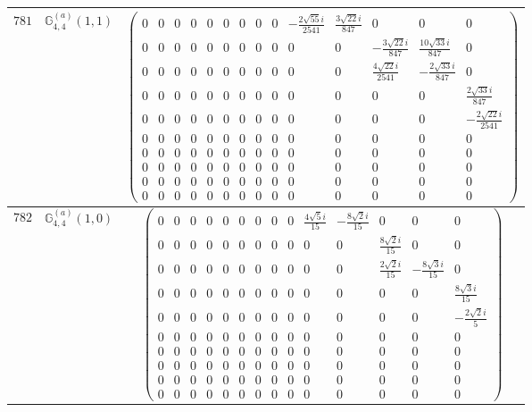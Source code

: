 \documentclass[fleqn,8pt,landscape]{jsarticle}
\begin{document}
\begin{center}
\begin{longtable}{ccc}
$ 781 $ & $ \mathbb{G}_{4,4}^{(a)}(1,1) $ & $ \begin{pmatrix} 0 & 0 & 0 & 0 & 0 & 0 & 0 & 0 & 0 & - \frac{2 \sqrt{55} i}{2541} & \frac{3 \sqrt{22} i}{847} & 0 & 0 & 0 \\ 0 & 0 & 0 & 0 & 0 & 0 & 0 & 0 & 0 & 0 & 0 & - \frac{3 \sqrt{22} i}{847} & \frac{10 \sqrt{33} i}{847} & 0 \\ 0 & 0 & 0 & 0 & 0 & 0 & 0 & 0 & 0 & 0 & 0 & \frac{4 \sqrt{22} i}{2541} & - \frac{2 \sqrt{33} i}{847} & 0 \\ 0 & 0 & 0 & 0 & 0 & 0 & 0 & 0 & 0 & 0 & 0 & 0 & 0 & \frac{2 \sqrt{33} i}{847} \\ 0 & 0 & 0 & 0 & 0 & 0 & 0 & 0 & 0 & 0 & 0 & 0 & 0 & - \frac{2 \sqrt{22} i}{2541} \\ 0 & 0 & 0 & 0 & 0 & 0 & 0 & 0 & 0 & 0 & 0 & 0 & 0 & 0 \\ 0 & 0 & 0 & 0 & 0 & 0 & 0 & 0 & 0 & 0 & 0 & 0 & 0 & 0 \\ 0 & 0 & 0 & 0 & 0 & 0 & 0 & 0 & 0 & 0 & 0 & 0 & 0 & 0 \\ 0 & 0 & 0 & 0 & 0 & 0 & 0 & 0 & 0 & 0 & 0 & 0 & 0 & 0 \\ 0 & 0 & 0 & 0 & 0 & 0 & 0 & 0 & 0 & 0 & 0 & 0 & 0 & 0 \end{pmatrix} $ \\ \hline
$ 782 $ & $ \mathbb{G}_{4,4}^{(a)}(1,0) $ & $ \begin{pmatrix} 0 & 0 & 0 & 0 & 0 & 0 & 0 & 0 & 0 & \frac{4 \sqrt{5} i}{15} & - \frac{8 \sqrt{2} i}{15} & 0 & 0 & 0 \\ 0 & 0 & 0 & 0 & 0 & 0 & 0 & 0 & 0 & 0 & 0 & \frac{8 \sqrt{2} i}{15} & 0 & 0 \\ 0 & 0 & 0 & 0 & 0 & 0 & 0 & 0 & 0 & 0 & 0 & \frac{2 \sqrt{2} i}{15} & - \frac{8 \sqrt{3} i}{15} & 0 \\ 0 & 0 & 0 & 0 & 0 & 0 & 0 & 0 & 0 & 0 & 0 & 0 & 0 & \frac{8 \sqrt{3} i}{15} \\ 0 & 0 & 0 & 0 & 0 & 0 & 0 & 0 & 0 & 0 & 0 & 0 & 0 & - \frac{2 \sqrt{2} i}{5} \\ 0 & 0 & 0 & 0 & 0 & 0 & 0 & 0 & 0 & 0 & 0 & 0 & 0 & 0 \\ 0 & 0 & 0 & 0 & 0 & 0 & 0 & 0 & 0 & 0 & 0 & 0 & 0 & 0 \\ 0 & 0 & 0 & 0 & 0 & 0 & 0 & 0 & 0 & 0 & 0 & 0 & 0 & 0 \\ 0 & 0 & 0 & 0 & 0 & 0 & 0 & 0 & 0 & 0 & 0 & 0 & 0 & 0 \\ 0 & 0 & 0 & 0 & 0 & 0 & 0 & 0 & 0 & 0 & 0 & 0 & 0 & 0 \end{pmatrix} $ \\ \hline

\end{longtable}
\end{center}
\end{document}
